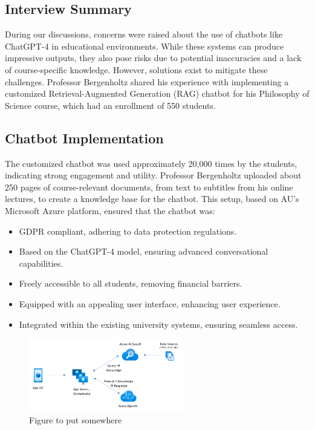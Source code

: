 \subsection*{Interview Summary}

During our discussions, concerns were raised about the use of chatbots like ChatGPT-4 in educational environments. While these systems can produce impressive outputs, they also pose risks due to potential inaccuracies and a lack of course-specific knowledge. However, solutions exist to mitigate these challenges. Professor Bergenholtz shared his experience with implementing a customized Retrieval-Augmented Generation (RAG) chatbot for his Philosophy of Science course, which had an enrollment of 550 students.

\subsection*{Chatbot Implementation}

The customized chatbot was used approximately 20,000 times by the students, indicating strong engagement and utility. Professor Bergenholtz uploaded about 250 pages of course-relevant documents, from text to subtitles from his online lectures, to create a knowledge base for the chatbot. This setup, based on AU's Microsoft Azure platform, ensured that the chatbot was:

\begin{itemize}
    \item GDPR compliant, adhering to data protection regulations.
    \item Based on the ChatGPT-4 model, ensuring advanced conversational capabilities.
    \item Freely accessible to all students, removing financial barriers.
    \item Equipped with an appealing user interface, enhancing user experience.
    \item Integrated within the existing university systems, ensuring seamless access.
\end{itemize}
\begin{figure}[H]
    \centering
    \includegraphics[width=0.6\textwidth]{figs/appcomponents.png}
    \caption{Figure to put somewhere}
    \label{fig:CLAI_Poster_Competition}
\end{figure}

